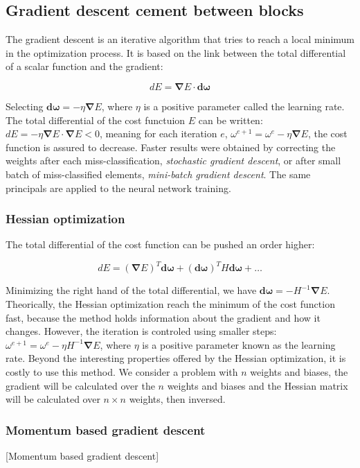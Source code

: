 \documentclass[final, paper=letter,5p,times,twocolumn]{elsarticle}
\begin{document}
\subsection{Gradient descent cement between blocks}

The gradient descent is an iterative algorithm that tries to reach a local minimum in the optimization process. It is based on the link between the total differential of a scalar function and the gradient:

$$
dE = \bm{\nabla}E \cdot \bm{d \omega}
$$

Selecting $\bm{d\omega} = -\eta \bm{\nabla}E$, where $\eta$ is a positive parameter called the learning rate. The total differential of the cost functuion $E$ can be written: $dE = -\eta \bm{\nabla}E \cdot \bm{\nabla}E < 0$, meaning for each iteration $e$, $\omega^{e+1} = \omega^{e} - \eta \bm{\nabla} E$, the cost function is assured to decrease. 
Faster results were obtained by correcting the weights after each miss-classification, {\it stochastic gradient descent}, or after small batch of miss-classified elements, {\it mini-batch gradient descent}. The same principals are applied to the neural network training.\\

\subsubsection{Hessian optimization}

The total differential of the cost function can be pushed an order higher:

$$
dE = (\bm{\nabla}E)^{T} \bm{d \omega} + (\bm{d \omega})^{T}H\bm{d \omega} + \dots
$$

Minimizing the right hand of the total differential, we have $\bm{d \omega} = - H^{-1} \bm{\nabla}E$. Theorically, the Hessian optimization reach the minimum of the cost function fast, because the method holds information about the gradient and how it changes. However, the iteration is controled using smaller steps: $\omega^{e+1} = \omega^{e} - \eta  H^{-1} \bm{\nabla}E$, where $\eta$ is a positive parameter known as the learning rate. Beyond the interesting properties offered by the Hessian optimization, it is costly to use this method. We consider a problem with $n$ weights and biases, the gradient will be calculated over the $n$ weights and biases and the Hessian matrix will be calculated over $n \times n$ weights, then inversed.

\subsubsection{Momentum based gradient descent}
[Momentum based gradient descent]
\end{document}
